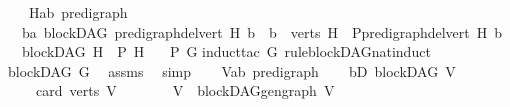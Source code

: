 \begin{isabellebody}
\ \ \ \ {\isachardoublequoteopen}{\isasymAnd}H{\isacharcolon}{\kern0pt}{\isacharcolon}{\kern0pt}{\isacharparenleft}{\kern0pt}{\isacharprime}{\kern0pt}a{\isacharcomma}{\kern0pt}{\isacharprime}{\kern0pt}b{\isacharparenright}{\kern0pt}\ pre{\isacharunderscore}{\kern0pt}digraph{\isachardot}{\kern0pt}\ \isanewline
\ \ \ {\isacharparenleft}{\kern0pt}{\isasymAnd}b{\isacharcolon}{\kern0pt}{\isacharcolon}{\kern0pt}{\isacharprime}{\kern0pt}a{\isachardot}{\kern0pt}\ blockDAG\ {\isacharparenleft}{\kern0pt}pre{\isacharunderscore}{\kern0pt}digraph{\isachardot}{\kern0pt}del{\isacharunderscore}{\kern0pt}vert\ H\ b{\isacharparenright}{\kern0pt}\ {\isasymLongrightarrow}\ b\ {\isasymin}\ verts\ H\ {\isasymLongrightarrow}\ P{\isacharparenleft}{\kern0pt}pre{\isacharunderscore}{\kern0pt}digraph{\isachardot}{\kern0pt}del{\isacharunderscore}{\kern0pt}vert\ H\ b{\isacharparenright}{\kern0pt}{\isacharparenright}{\kern0pt}\isanewline
\ \ {\isasymLongrightarrow}\ {\isacharparenleft}{\kern0pt}blockDAG\ H\ {\isasymLongrightarrow}\ P\ H{\isacharparenright}{\kern0pt}{\isachardoublequoteclose}\isanewline
\ \ \ {\isachardoublequoteopen}P\ G{\isachardoublequoteclose}\isanewline
%
\isadelimproof
%
\endisadelimproof
%
\isatagproof
{}\isamarkupfalse%
{\isacharparenleft}{\kern0pt}induct{\isacharunderscore}{\kern0pt}tac\ G\ rule{\isacharcolon}{\kern0pt}blockDAG{\isacharunderscore}{\kern0pt}nat{\isacharunderscore}{\kern0pt}induct{\isacharparenright}{\kern0pt}\ \isanewline
\ \ \isamarkupfalse%
\ {\isachardoublequoteopen}blockDAG\ G{\isachardoublequoteclose}\ \isamarkupfalse%
\ assms{\isacharparenleft}{\kern0pt}{}{\isacharparenright}{\kern0pt}\ \isamarkupfalse%
\ simp\isanewline
{}\isamarkupfalse%
\isanewline
\ \ \isamarkupfalse%
\ V{\isacharcolon}{\kern0pt}{\isacharcolon}{\kern0pt}{\isachardoublequoteopen}{\isacharparenleft}{\kern0pt}{\isacharprime}{\kern0pt}a{\isacharcomma}{\kern0pt}{\isacharprime}{\kern0pt}b{\isacharparenright}{\kern0pt}\ pre{\isacharunderscore}{\kern0pt}digraph{\isachardoublequoteclose}\isanewline
\ \ \isamarkupfalse%
\ bD{\isacharcolon}{\kern0pt}\ {\isachardoublequoteopen}blockDAG\ V{\isachardoublequoteclose}\ \isanewline
\ \ \ \ \ {\isachardoublequoteopen}card\ {\isacharparenleft}{\kern0pt}verts\ V{\isacharparenright}{\kern0pt}\ {\isacharequal}{\kern0pt}\ {}{\isachardoublequoteclose}\isanewline
\ \ \isamarkupfalse%
\ \isamarkupfalse%
\ {\isachardoublequoteopen}V\ {\isacharequal}{\kern0pt}\ blockDAG{\isachardot}{\kern0pt}gen{\isacharunderscore}{\kern0pt}graph\ V{\isachardoublequoteclose}\isanewline

\end{isabellebody}
